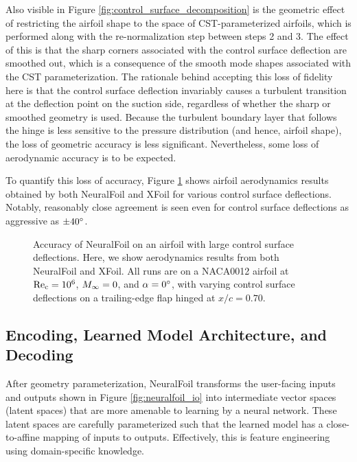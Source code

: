 Also visible in Figure \ref{fig:control_surface_decomposition} is the geometric effect of restricting the airfoil shape to the space of CST-parameterized airfoils, which is performed along with the re-normalization step between steps 2 and 3. The effect of this is that the sharp corners associated with the control surface deflection are smoothed out, which is a consequence of the smooth mode shapes associated with the CST parameterization. The rationale behind accepting this loss of fidelity here is that the control surface deflection invariably causes a turbulent transition at the deflection point on the suction side, regardless of whether the sharp or smoothed geometry is used. Because the turbulent boundary layer that follows the hinge is less sensitive to the pressure distribution (and hence, airfoil shape), the loss of geometric accuracy is less significant. Nevertheless, some loss of aerodynamic accuracy is to be expected.

To quantify this loss of accuracy, Figure \ref{fig:control_surface_accuracy} shows airfoil aerodynamics results obtained by both NeuralFoil and XFoil for various control surface deflections. Notably, reasonably close agreement is seen even for control surface deflections as aggressive as $\pm40 \degree$.

\begin{figure}[H]
    \centering
            \caption{Accuracy of NeuralFoil on an airfoil with large control surface deflections. Here, we show aerodynamics results from both NeuralFoil and XFoil. All runs are on a NACA0012 airfoil at $\rm Re_c = 10^6$, $M_\infty=0$, and $\alpha = 0\degree$, with varying control surface deflections on a trailing-edge flap hinged at $x/c=0.70$.}
    \label{fig:control_surface_accuracy}
\end{figure}

\subsection{Encoding, Learned Model Architecture, and Decoding}

After geometry parameterization, NeuralFoil transforms the user-facing inputs and outputs shown in Figure \ref{fig:neuralfoil_io} into intermediate vector spaces (latent spaces) that are more amenable to learning by a neural network. These latent spaces are carefully parameterized such that the learned model has a close-to-affine mapping of inputs to outputs. Effectively, this is feature engineering using domain-specific knowledge.

